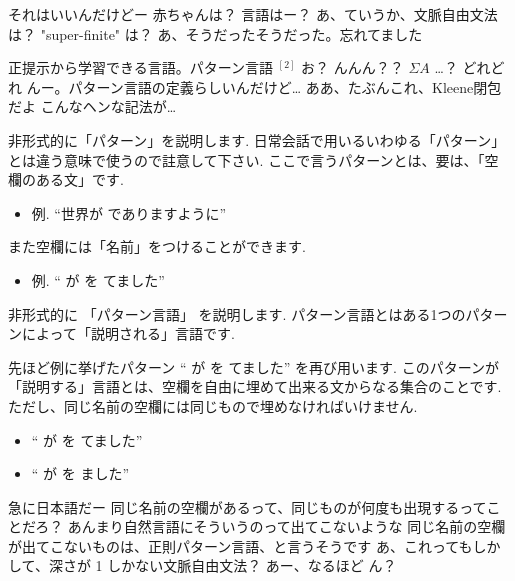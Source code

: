 \PAUSE

\YUKARI それはいいんだけどー
\YUKARI 赤ちゃんは？ 言語はー？
\YUI あ、ていうか、文脈自由文法は？ "super-finite" は？
\YUZUKO あ、そうだったそうだった。忘れてました

\PAUSE

\YUI 正提示から学習できる言語。パターン言語 ${}^{[2]}$
\YUZUKO お？
\YUI んんん？？ $\Sigma A$ …？
\YUZUKO どれどれ
\YUI んー。パターン言語の定義らしいんだけど…
\YUZUKO ああ、たぶんこれ、Kleene閉包だよ
\YUI こんなヘンな記法が…

\begin{boxnote}
    非形式的に「パターン」を説明します.
    日常会話で用いるいわゆる「パターン」とは違う意味で使うので註意して下さい.
    ここで言うパターンとは、要は、「空欄のある文」です.
    \begin{itemize}
        \item 例. ``世界が \fbox{　　} でありますように''
    \end{itemize}
    また空欄には「名前」をつけることができます.
    \begin{itemize}
        \item 例. `` が  を  てました''
    \end{itemize}
\end{boxnote}

\begin{boxnote}
    非形式的に 「パターン言語」 を説明します.
    パターン言語とはある1つのパターンによって「説明される」言語です.

    先ほど例に挙げたパターン `` が  を  てました'' を再び用います.
    このパターンが「説明する」言語とは、空欄を自由に埋めて出来る文からなる集合のことです.
    ただし、同じ名前の空欄には同じもので埋めなければいけません.
    \begin{itemize}
        \setlength{\itemsep}{0mm}
        \item `` が  を  てました''
        \item `` が  を  ました''
    \end{itemize}
\end{boxnote}

\YUKARI 急に日本語だー
\YUI 同じ名前の空欄があるって、同じものが何度も出現するってことだろ？
\YUI あんまり自然言語にそういうのって出てこないような
\YUKARI 同じ名前の空欄が出てこないものは、正則パターン言語、と言うそうです
\YUZUKO あ、これってもしかして、深さが 1 しかない文脈自由文法？
\YUI あー、なるほど
\YUI ん？


